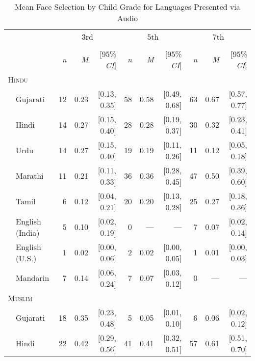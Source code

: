\begin{table}[H]
\centering
\caption{Mean Face Selection by Child Grade for Languages Presented via Audio}\\
\begin{footnotesize}
\label{tab:face-audio-means}
\begin{tabular}{p{.1in}lrrrrrrrrr}
\toprule
 &  & \multicolumn{3}{c}{3rd} & \multicolumn{3}{c}{5th} & \multicolumn{3}{c}{7th} \\
\cline{3-5} \cline{6-8} \cline{9-11}\\[-.75em]
&  & \textit{n} & \textit{M} & [95\% \textit{CI}] &  \textit{n} & \textit{M} & [95\% \textit{CI}] &  \textit{n}  & \textit{M} & [95\% \textit{CI}]\\
\midrule
\multicolumn{11}{l}{\textsc{Hindu}}\\
& Gujarati & 12 & 0.23 & [0.13, 0.35] & 58 & 0.58 & [0.49, 0.68] & 63 & 0.67 & [0.57, 0.77]\\

 & Hindi & 14 & 0.27 & [0.15, 0.40] & 28 & 0.28 & [0.19, 0.37] & 30 & 0.32 & [0.23, 0.41]\\

 & Urdu & 14 & 0.27 & [0.15, 0.40] & 19 & 0.19 & [0.11, 0.26] & 11 & 0.12 & [0.05, 0.18]\\

 & Marathi & 11 & 0.21 & [0.11, 0.33] & 36 & 0.36 & [0.28, 0.45] & 47 & 0.50 & [0.39, 0.60]\\

 & Tamil & 6 & 0.12 & [0.04, 0.21] & 20 & 0.20 & [0.13, 0.28] & 25 & 0.27 & [0.18, 0.36]\\

 & English (India) & 5 & 0.10 & [0.02, 0.19] & 0 & --- & --- & 7 & 0.07 & [0.02, 0.14]\\

 & English (U.S.) & 1 & 0.02 & [0.00, 0.06] & 2 & 0.02 & [0.00, 0.05] & 1 & 0.01 & [0.00, 0.03]\\

 & Mandarin & 7 & 0.14 & [0.06, 0.24] & 7 & 0.07 & [0.03, 0.12] & 0 & --- & ---\\
\midrule
\multicolumn{11}{l}{\textsc{Muslim}}\\
& Gujarati & 18 & 0.35 & [0.23, 0.48] & 5 & 0.05 & [0.01, 0.10] & 6 & 0.06 & [0.02, 0.12]\\

 & Hindi & 22 & 0.42 & [0.29, 0.56] & 41 & 0.41 & [0.32, 0.51] & 57 & 0.61 & [0.51, 0.70]\\


\end{tabular}
\end{footnotesize}
\end{table}
